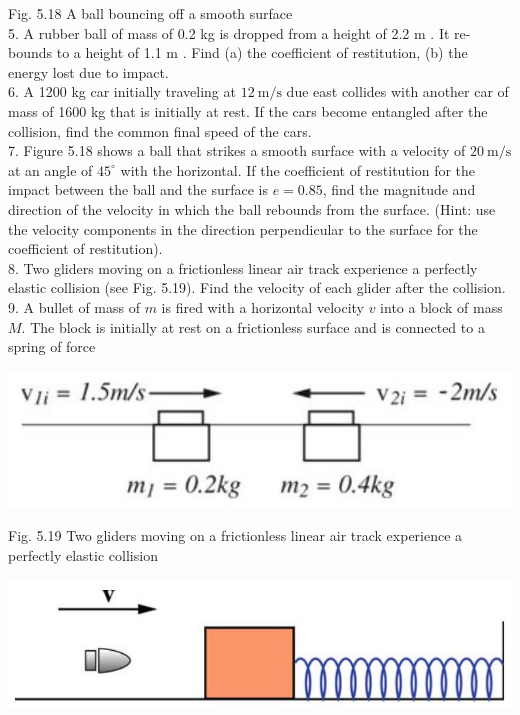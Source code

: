 \documentclass[10pt]{article}
\begin{document}
Fig. 5.18 A ball bouncing off a smooth surface\\
5. A rubber ball of mass of 0.2 kg is dropped from a height of 2.2 m . It re- bounds to a height of 1.1 m . Find (a) the coefficient of restitution, (b) the energy lost due to impact.\\
6. A 1200 kg car initially traveling at $12 \mathrm{~m} / \mathrm{s}$ due east collides with another car of mass of 1600 kg that is initially at rest. If the cars become entangled after the collision, find the common final speed of the cars.\\
7. Figure 5.18 shows a ball that strikes a smooth surface with a velocity of $20 \mathrm{~m} / \mathrm{s}$ at an angle of $45^{\circ}$ with the horizontal. If the coefficient of restitution for the impact between the ball and the surface is $e=0.85$, find the magnitude and direction of the velocity in which the ball rebounds from the surface. (Hint: use the velocity components in the direction perpendicular to the surface for the coefficient of restitution).\\
8. Two gliders moving on a frictionless linear air track experience a perfectly elastic collision (see Fig. 5.19). Find the velocity of each glider after the collision.\\
9. A bullet of mass of $m$ is fired with a horizontal velocity $v$ into a block of mass $M$. The block is initially at rest on a frictionless surface and is connected to a spring of force

\begin{center}
\includegraphics[max width=\textwidth]{2024_09_13_db1f357d2aad0a03eb2eg-093(3)}
\end{center}

Fig. 5.19 Two gliders moving on a frictionless linear air track experience a perfectly elastic collision

\begin{center}
\includegraphics[max width=\textwidth]{2024_09_13_db1f357d2aad0a03eb2eg-093(5)}
\end{center}
\end{document}
